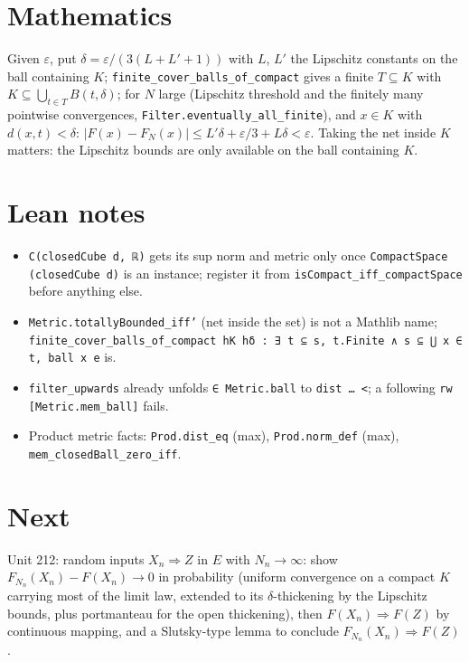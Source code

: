 \documentclass[11pt]{article}
\begin{document}
\section{Mathematics}
Given $\varepsilon$, put $\delta=\varepsilon/(3(L+L'+1))$ with $L$, $L'$ the Lipschitz constants on
the ball containing $K$; \texttt{finite\_cover\_balls\_of\_compact} gives a finite $T\subseteq K$
with $K\subseteq\bigcup_{t\in T}B(t,\delta)$; for $N$ large (Lipschitz threshold and the finitely
many pointwise convergences, \texttt{Filter.eventually\_all\_finite}), and $x\in K$ with
$d(x,t)<\delta$:
$|F(x)-F_N(x)|\le L'\delta+\varepsilon/3+L\delta<\varepsilon$. Taking the net inside $K$ matters:
the Lipschitz bounds are only available on the ball containing $K$.

\section{Lean notes}
\begin{itemize}
\item \texttt{C(closedCube d, ℝ)} gets its sup norm and metric only once
  \texttt{CompactSpace (closedCube d)} is an instance; register it from
  \texttt{isCompact\_iff\_compactSpace} before anything else.
\item \texttt{Metric.totallyBounded\_iff'} (net inside the set) is not a Mathlib name;
  \texttt{finite\_cover\_balls\_of\_compact hK hδ : ∃ t ⊆ s, t.Finite ∧ s ⊆ ⋃ x ∈ t, ball x e} is.
\item \texttt{filter\_upwards} already unfolds \texttt{∈ Metric.ball} to \texttt{dist … <}; a following
  \texttt{rw [Metric.mem\_ball]} fails.
\item Product metric facts: \texttt{Prod.dist\_eq} (max), \texttt{Prod.norm\_def} (max),
  \texttt{mem\_closedBall\_zero\_iff}.
\end{itemize}

\section{Next}
Unit 212: random inputs $X_n\Rightarrow Z$ in $E$ with $N_n\to\infty$: show
$F_{N_n}(X_n)-F(X_n)\to0$ in probability (uniform convergence on a compact $K$ carrying most of the
limit law, extended to its $\delta$-thickening by the Lipschitz bounds, plus portmanteau for the open
thickening), then $F(X_n)\Rightarrow F(Z)$ by continuous mapping, and a Slutsky-type lemma to
conclude $F_{N_n}(X_n)\Rightarrow F(Z)$.
\end{document}
